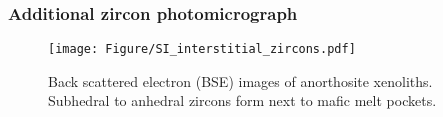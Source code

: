 \documentclass[11pt,letterpaper]{article}
\begin{document}


\subsubsection*{Additional zircon photomicrograph}
\begin{figure}[h!]
\noindent\texttt{[image: Figure/SI\_interstitial\_zircons.pdf]}
\caption{\footnotesize{Back scattered electron (BSE) images of anorthosite xenoliths. Subhedral to anhedral zircons form next to mafic melt pockets.}}
\label{fig:interstitial_zircons}
\end{figure}
\end{document}
